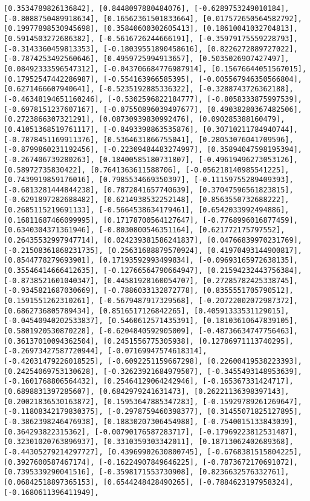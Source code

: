 \documentclass[11pt]{article}
\begin{document}
\begin{Verbatim}[commandchars=\\\{\}]
[0.3534789826136842], [0.8448097880484076], [-0.6289753249010184], [-0.8088750489918634], [0.16562361501833664], [0.017572650564582792], [0.19977898530945698], [0.35840600302605413], [0.18610041032704813], [0.5914503272686382], [-0.5616726244666191], [-0.35979175559228793], [-0.3143360459813353], [-0.18039551890458616], [0.8226272889727022], [-0.7874253492560646], [0.4959725994913657], [0.5035026907427497], [0.08492333596547312], [-0.043706684776987914], [0.15676644051567015], [0.17952547442286987], [-0.554163966585395], [-0.005567946350566804], [0.6271466607940641], [-0.5235192885336322], [-0.3288743726362188], [-0.46348194651160246], [-0.5302596822184777], [-0.8058333875997539], [-0.6978151237607167], [-0.07550896039497677], [0.49038280367482506], [0.2723866307321291], [0.08730939830992476], [0.090285388160479], [0.41051368519761117], [-0.8493398863535876], [0.30710211784940744], [-0.7878451169911376], [0.5364631866755041], [0.28053076041709596], [-0.8799860231192456], [-0.22309484483274997], [0.35894047598195394], [-0.267406739280263], [0.18400585180731807], [-0.49619496273053126], [0.58972735830422], [0.7641363611588706], [-0.056218140985541225], [0.7439919859176016], [0.7985534669350397], [-0.11159755289409393], [-0.6813281444844238], [0.7872841657740639], [0.37047596561823815], [-0.6291897282688482], [0.6214938532252148], [0.8563550732688222], [0.2685115219691133], [-0.5664538634179461], [0.6542033992494886], [0.16811687466099995], [0.17178700564127647], [-0.7768996016877459], [0.6340304371361946], [-0.8030800546351164], [0.621772175797552], [0.26435532997947714], [0.024239381586241837], [0.04766839970231769], [-0.21508361868231735], [0.25631688879570924], [0.41970493144900817], [0.8544778279693901], [0.17193592993499834], [-0.09693165972638135], [0.35546414666412635], [-0.12766564790664947], [0.21594232443756384], [-0.8738521601040347], [0.44581928160054707], [0.27285782425338745], [-0.9345821687030669], [-0.7886033132872778], [0.8355551705790512], [0.1591551262310261], [-0.5679487917329568], [-0.20722002072987372], [0.6862736805789434], [0.8516517126842265], [0.40591333531129015], [-0.04540940202533837], [0.5460612571435391], [0.18103610647839105], [0.5801920530870228], [-0.6204840592905009], [-0.48736634747756463], [0.36137010094362504], [0.2451556775305938], [0.12786971113740295], [-0.26973427587720944], [-0.07169947574618314], [-0.42031479226018525], [-0.6092251159667298], [0.22600419538223393], [0.24254069753130628], [-0.32623921684979507], [-0.3455493148953639], [-0.1601768806564432], [0.25464129064242946], [-0.165367331424717], [0.6898831397285607], [0.6842979241631473], [0.26221136398397143], [0.20021836530163872], [0.15953647885347283], [-0.15929789261269647], [-0.11808342179830375], [-0.2978759460398377], [0.31455071825127895], [-0.3862398246476938], [0.18830207306454988], [-0.7540015133843039], [0.364293822315362], [-0.00790176587283717], [-0.17969223812531487], [0.32301020763896937], [0.3310359303342011], [0.18713062402689368], [-0.44305279214297727], [0.43969902630800745], [-0.6768381515804225], [0.3927600587467174], [-0.16224907849646225], [-0.7873672170691072], [0.7395339290041516], [-0.3598171553730908], [0.8236632576332761], [0.06842518897365153], [0.6544248428490265], [-0.7884623197958324], [-0.1680611396411949], 
\end{Verbatim}
\end{document}
